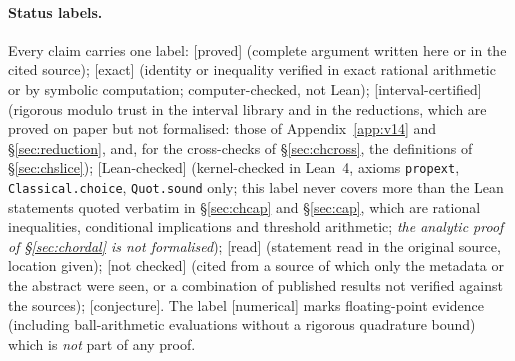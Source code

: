 \documentclass[11pt,a4paper]{article}
\theoremstyle{remark}
\theoremstyle{definition}
\theoremstyle{plain}
\theoremstyle{remark}
\newcommand{\Z}{\mathbb{Z}}
\newcommand{\E}{\mathbb{E}}
\newcommand{\st}[1]{\textsf{[#1]}}
\begin{document}
\begin{abstract}
In version~2.2, Rajabu states that the Wilson specification on $\Z^4$ has exactly one Gibbs measure for $0<\beta_W\le0.511$ (Theorem~9.1(i)), with exponential clustering of gauge-invariant local chordal-Lipschitz observables and a gap of the physical transfer matrix for $0<\beta_W\le0.51$ (Theorem~9.1(ii)--(iii)); he also states uniqueness in every half-space for every boundary condition for $0<\beta_W\le0.419$ (Section~11).
Part~II states Wilson's area law on tori for $\beta_W<2/3$ (Corollary~7.7(iii)). These stated uniqueness ranges go beyond $2/9$,
and the area-law range $2/3$ is stated there before \S\ref{sec:area} of this note; we make \emph{no priority claim} on them either (\S\ref{sec:lit}). This note's own contributions are: the exact value
$\E_\kappa[x_\perp^2]=I_2/(\kappa I_1)$ of the supremum over directions for every $\kappa\ge0$, its maximisers, the
two-sided estimate for oblique directions and the strict monotonicity in $\kappa$, with an analytic proof; the exact
geodesic coefficient $8\beta/(9\pi)$ for $\kappa\le3\pi/8$; two interval-arithmetic certificates, each recertified by an
independent implementation (Appendix~\ref{app:v14} and \S\ref{sec:cap}), with Lean-checked final steps; an explicit
transfer of the published constants of Levin, Royer and Shen--Zhu--Zhu with their conventions; and the area-law application of
Section~\ref{sec:area} (an independent proof by Dobrushin's comparison, valid for every Gibbs measure and with explicit constants;
the range itself is not new, see above).
\end{abstract}

\paragraph{Status labels.}
Every claim carries one label:
\st{proved} (complete argument written here or in the cited source);
\st{exact} (identity or inequality verified in exact rational arithmetic or by symbolic computation; computer-checked, not Lean);
\st{interval-certified} (rigorous modulo trust in the interval library and in the reductions, which are proved on paper but
not formalised: those of Appendix~\ref{app:v14} and \S\ref{sec:reduction}, and, for the cross-checks of \S\ref{sec:chcross},
the definitions of \S\ref{sec:chslice});
\st{Lean-checked} (kernel-checked in Lean~4, axioms \texttt{propext}, \texttt{Classical.choice}, \texttt{Quot.sound} only;
this label never covers more than the Lean statements quoted verbatim in \S\ref{sec:chcap} and \S\ref{sec:cap},
which are rational inequalities, conditional implications and threshold arithmetic; \emph{the analytic proof of
\S\ref{sec:chordal} is not formalised});
\st{read} (statement read in the original source, location given);
\st{not checked} (cited from a source of which only the metadata or the abstract were seen, or a combination of published results not verified against the sources);
\st{conjecture}.
The label \st{numerical} marks floating-point evidence (including ball-arithmetic evaluations without a rigorous quadrature
bound) which is \emph{not} part of any proof.
\end{document}
